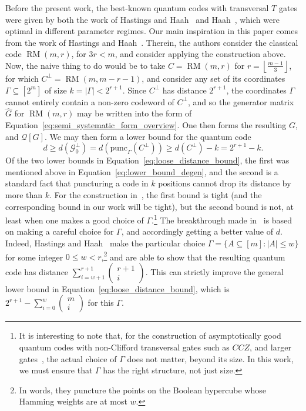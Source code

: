 \documentclass{article}
\newcounter{main}[section]
\DeclareMathOperator{\RM}{RM}
\begin{document}
Before the present work, the best-known quantum codes with transversal $T$ gates were given by both the work of Hastings and Haah~\cite{hastings2018distillation} and Haah~\cite{haah2018towers}, which were optimal in different parameter regimes. Our main inspiration in this paper comes from the work of Hastings and Haah~\cite{hastings2018distillation}. Therein, the authors consider the classical code $\RM(m,r)$, for $3r < m$, and consider applying the construction above. Now, the naive thing to do would be to take $C = \RM(m,r)$ for $r = \left\lfloor\frac{m-1}{3}\right\rfloor$, for which $C^\perp = \RM(m,m-r-1)$, and consider any set of its coordinates $\Gamma \subseteq [2^m]$ of size $k = |\Gamma| < 2^{r+1}$. Since $C^\perp$ has distance $2^{r+1}$, the coordinates $\Gamma$ cannot entirely contain a non-zero codeword of $C^\perp$, and so the generator matrix $\hat{G}$ for $\RM(m,r)$ may be written into the form of Equation~\eqref{eq:semi_systematic_form_overview}. One then forms the resulting $G$, and $\mathcal{Q}[G]$. We may then form a lower bound for the quantum code
\begin{equation}\label{eq:loose_distance_bound}
    d \geq d\left(\mathcal{G}_0^\perp\right) = d\left(\text{punc}_\Gamma\left(C^\perp\right)\right) \geq d\left(C^\perp\right) - k = 2^{r+1} - k.
\end{equation}
Of the two lower bounds in Equation~\eqref{eq:loose_distance_bound}, the first was mentioned above in Equation~\eqref{eq:lower_bound_degen}, and the second is a standard fact that puncturing a code in $k$ positions cannot drop its distance by more than $k$. For the construction in~\cite{hastings2018distillation}, the first bound is tight (and the corresponding bound in our work will be tight), but the second bound is not, at least when one makes a good choice of $\Gamma$.\footnote{It is interesting to note that, for the construction of asymptotically good quantum codes with non-Clifford transversal gates such as $CCZ$, and larger gates~\cite{wills2024,golowich2025asymptotically,nguyen2024good}, the actual choice of $\Gamma$ does not matter, beyond its size. In this work, we must ensure that $\Gamma$ has the right structure, not just size.} The breakthrough made in~\cite{hastings2018distillation} is based on making a careful choice for $\Gamma$, and accordingly getting a better value of $d$. Indeed, Hastings and Haah~\cite{hastings2018distillation} make the particular choice $\Gamma = \{A \subseteq [m]: |A| \leq w\}$ for some integer $0 \leq w < r$,\footnote{In words, they puncture the points on the Boolean hypercube whose Hamming weights are at most $w$.} and are able to show that the resulting quantum code has distance $\sum_{i=w+1}^{r+1}\left(\begin{smallmatrix}r+1\\i\end{smallmatrix}\right)$. This can strictly improve the general lower bound in Equation~\eqref{eq:loose_distance_bound}, which is $2^{r+1} - \sum_{i=0}^w\left(\begin{smallmatrix}m\\i\end{smallmatrix}\right)$ for this $\Gamma$.
\end{document}
